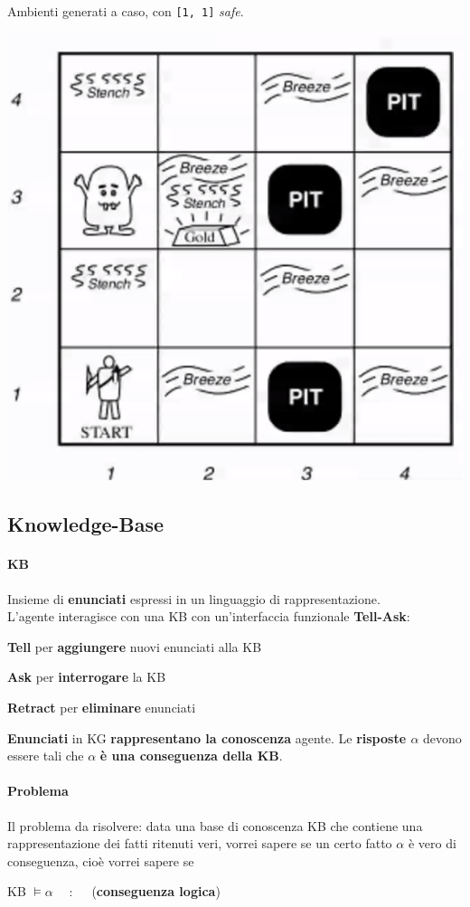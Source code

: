 \documentclass[10pt]{book}
\begin{document}
\begin{multicols}{2}
Ambienti generati a caso, con \texttt{[1, 1]} \textit{safe}.
\begin{center}
	\includegraphics[scale=0.6]{wumpus.png}
\end{center}
\end{multicols}
\subsection{Knowledge-Base}
\paragraph{KB} Insieme di \textbf{enunciati} espressi in un linguaggio di rappresentazione.\\
L'agente interagisce con una KB con un'interfaccia funzionale \textbf{Tell-Ask}:
\begin{list}{}{}
	\item \textbf{Tell} per \textbf{aggiungere} nuovi enunciati alla KB
	\item \textbf{Ask} per \textbf{interrogare} la KB
	\item \textbf{Retract} per \textbf{eliminare} enunciati
\end{list}
\textbf{Enunciati} in KG \textbf{rappresentano la conoscenza} agente. Le \textbf{risposte $\alpha$} devono essere tali che $\alpha$ \textbf{è una conseguenza della KB}.
\paragraph{Problema} Il problema da risolvere: data una base di conoscenza KB che contiene una rappresentazione dei fatti ritenuti veri, vorrei sapere se un certo fatto $\alpha$ è vero di conseguenza, cioè vorrei sapere se 
\begin{center}
KB $\vDash \alpha$ $\:\:\:\:\-:\:\:\:\:\:$ (\textbf{conseguenza logica})
\end{center}
\pagebreak
\end{document}
